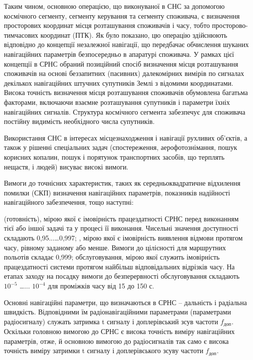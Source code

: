 Таким чином, основною операцією, що виконуваної в СНС за допомогою космічного сегменту, сегменту 
керування та сегменту споживача, є визначення просторових координат місця розташування споживачів і 
часу, тобто просторово-тимчасових координат (ПТК). Як було показано, цю операцію здійснюють відповідно 
до концепції незалежної навігації, що передбачає обчислення шуканих навігаційних параметрів 
безпосередньо в апаратурі споживача. У рамках цієї концепції в СРНС обраний позиційний спосіб 
визначення місця розташування споживачів на основі беззапитних (пасивних) далекомірних вимірів по 
сигналах декількох навігаційних штучних супутників Землі з відомими координатами. Висока точність 
визначення місця розташування споживачів обумовлена багатьма факторами, включаючи взаємне розташування 
супутників і параметри їхніх навігаційних сигналів. Структура космічного сегмента забезпечує для 
споживача постійну видимість необхідного числа супутників.

Використання СНС в інтересах місцезнаходження і навігації рухливих об'єктів, а також у рішенні 
спеціальних задач (спостереження, аерофотознімання, пошук корисних копалин, пошук і порятунок 
транспортних засобів, що терплять нещастя, і людей) висуває високі вимоги.

Вимоги до точнісних характеристик, таких як середньоквадратичне відхилення помилки (СКП) визначення 
навігаційних параметрів, показників надійності навігаційного забезпечення, тощо наступні:
\begin{itemize}
   (готовність),  мірою якої є імовірність працездатності СРНС перед виконанням 
тієї або іншої задачі та у процесі її виконання. Чисельні значення доступності складають 0,95...\dots 0,997;
 , мірою якої є імовірність виявлення відмови протягом часу, рівному заданому 
або менше. Вимоги до цілісності для маршрутних польотів складає 0,999;
  обслуговування, мірою якої служить імовірність працездатності системи 
протягом найбільш відповідальних відрізків часу. На етапах заходу на посадку вимоги до безперервності 
обслуговування складають $10^{-5}$ \dots ... $10^{-4}$ для проміжків часу від 15 до 150 с.
\end{itemize}

Основні навігаційні параметри, що визначаються в СРНС -- дальність і радіальна швидкість. Відповідними 
їм радіонавігаційними параметрами (параметрами радіосигналу) служать затримка t сигналу і доплерівський 
зсув частоти $f_\text{доп}$. Оскільки головною вимогою до СРНС є висока точність виміру 
навігаційних параметрів, отже, й основною вимогою до радіосигналів так само є висока точність 
виміру затримки t сигналу і доплерівського зсуву частоти $f_\text{доп}$.

